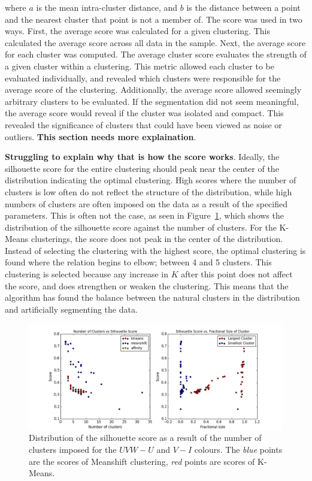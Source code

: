 where $a$ is the mean intra-cluster distance, and $b$ is the distance between a point and the nearest cluster that point is not a member of.
The score was used in two ways.
First, the average score was calculated for a given clustering.
This calculated the average score across all data in the sample.
Next, the average score for each cluster was computed.
The average cluster score evaluates the strength of a given cluster within a clustering.
This metric allowed each cluster to be evaluated individually, and revealed which clusters were responsible for the average score of the clustering.
Additionally, the average score allowed seemingly arbitrary clusters to be evaluated.
If the segmentation did not seem meaningful, the average score would reveal if the cluster was isolated and compact.
This revealed the significance of clusters that could have been viewed as noise or outliers. \textbf{This section needs more explaination}.

\textbf{Struggling to explain why that is how the score works}. 
Ideally, the silhouette score for the entire clustering should peak near the center of the distribution indicating the optimal clustering. 
High scores where the number of clusters is low often do not reflect the structure of the distribution, while high numbers of clusters are often imposed on the data as a result of the specified parameters.
This is often not the case, as seen in Figure~\ref{fig:sscore}, which shows the distribution of the silhouette score against the number of clusters.
For the K-Means clusterings, the score does not peak in the center of the distribution.
Instead of selecting the clustering with the highest score, the optimal clustering is found where the relation begins to elbow; between 4 and 5 clusters.
This clustering is selected because any increase in $K$ after this point does not affect the score, and does strengthen or weaken the clustering.
This means that the algorithm has found the balance between the natural clusters in the distribution and artificially segmenting the data.

\begin{figure}[H]
\centering
\includegraphics[width=\linewidth]{figs/methods/silhouette_score_relation}
\caption{Distribution of the silhouette score as a result of the number of clusters imposed for the $UVW - U$ and $V - I$ colours. The \textit{blue} points are the scores of Meanshift clustering, \textit{red} points are scores of K-Means.}
\label{fig:sscore}
\end{figure}

